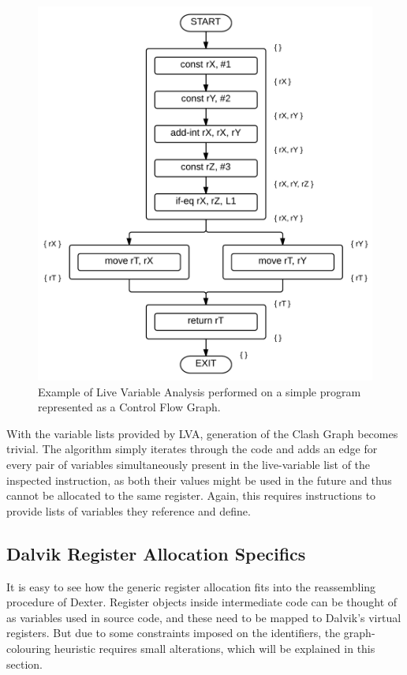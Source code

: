 \documentclass[12pt,twoside,notitlepage]{report}
\begin{document}
\begin{figure}
	\centerline{	
		\includegraphics[height=0.42\textheight]{figs/fig_implementation_lva.png}
	}
	\caption{Example of Live Variable Analysis performed on a simple program represented as a Control Flow Graph.}
	\label{fig:Implementation_LVA}
\end{figure}

With the variable lists provided by LVA, generation of the Clash Graph becomes trivial. The algorithm simply iterates through the code and adds an edge for every pair of variables simultaneously present in the live-variable list of the inspected instruction, as both their values might be used in the future and thus cannot be allocated to the same register. Again, this requires instructions to provide lists of variables they reference and define.

\subsection{Dalvik Register Allocation Specifics}

It is easy to see how the generic register allocation fits into the reassembling procedure of Dexter. Register objects inside intermediate code can be thought of as variables used in source code, and these need to be mapped to Dalvik's virtual registers. But due to some constraints imposed on the identifiers, the graph-colouring heuristic requires small alterations, which will be explained in this section.
\end{document}
